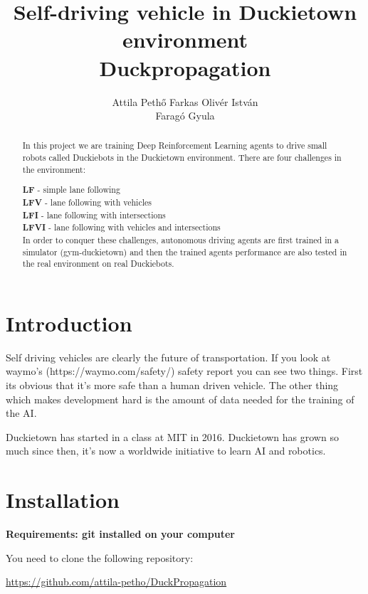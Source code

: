 \documentclass{article}
\title{Self-driving vehicle in Duckietown environment\\
	\large Duckpropagation }
\author{
  Attila Pethő
   \And  
   Farkas Olivér István \\
   \And
    Faragó Gyula\\
}
\begin{document}

\maketitle

\begin{abstract}
  In this project we are training Deep Reinforcement Learning agents to drive small robots called Duckiebots in the Duckietown environment. There are four challenges in the environment:

\textbullet  \textbf{LF} - simple lane following\\
\textbullet \textbf{LFV} - lane following with vehicles\\
\textbullet \textbf{LFI} - lane following with intersections\\
\textbullet \textbf{LFVI} - lane following with vehicles and intersections\\
In order to conquer these challenges, autonomous driving agents are first trained in a simulator (gym-duckietown) and then the trained agents performance are also tested in the real environment on real Duckiebots.
\end{abstract}

\section{\large{Introduction}}

Self driving vehicles are clearly the future of transportation. If you look at waymo's  (https://waymo.com/safety/) safety report you can see two things. First its obvious that it's more safe than a human driven vehicle. The other thing which makes development hard is the amount of data needed for the training of the AI.

\bigbreak

Duckietown has started in a class at MIT in 2016. Duckietown has grown so much since then, it's now a worldwide initiative to learn AI and robotics.

\section{\large{Installation}}

\textbf{Requirements: git installed on your computer}

You need to clone the following repository:\\
\begin{center}
  \url{https://github.com/attila-petho/DuckPropagation}
\end{center}
\end{document}
